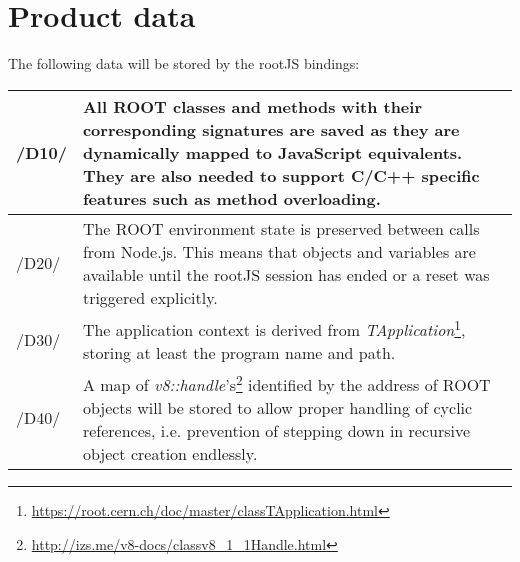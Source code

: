 \chapter{Product data}

The following data will be stored by the rootJS bindings: \\

\begin{longtable}{|p{1cm} | p{15cm}|}
\hline
/D10/ & All ROOT classes and methods with their corresponding signatures are saved as they are dynamically mapped to JavaScript equivalents. They are also needed to support C/C++ specific features such as method overloading.\\
\hline
/D20/ & The ROOT environment state is preserved between calls from Node.js. This means that objects and variables are available until the rootJS session has ended or a reset was triggered explicitly.\\
\hline
/D30/ & The application context is derived from \textit{TApplication}\footnote{\url{https://root.cern.ch/doc/master/classTApplication.html}}, storing at least the program name and path.\\
\hline
/D40/ & A map of \textit{v8::handle}'s\footnote{\url{http://izs.me/v8-docs/classv8_1_1Handle.html}} identified by the address of ROOT objects will be stored to allow proper handling of cyclic references, i.e. prevention of stepping down in recursive object creation endlessly.\\
\hline
\end{longtable}